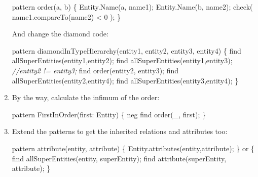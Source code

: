 \documentclass[]{report}
\newenvironment{Shaded}{}{}
\newcommand{\DecValTok}[1]{\textcolor[rgb]{0.25,0.63,0.44}{{#1}}}
\newcommand{\CommentTok}[1]{\textcolor[rgb]{0.38,0.63,0.69}{\textit{{#1}}}}
\newcommand{\FunctionTok}[1]{\textcolor[rgb]{0.02,0.16,0.49}{{#1}}}
\newcommand{\NormalTok}[1]{{#1}}
\begin{document}
\begin{enumerate}
\begin{Shaded}
\begin{Highlighting}[]
\NormalTok{pattern }\FunctionTok{order}\NormalTok{(a, b) \{}
    \NormalTok{Entity.}\FunctionTok{Name}\NormalTok{(a, name1);}
    \NormalTok{Entity.}\FunctionTok{Name}\NormalTok{(b, name2);}
    \FunctionTok{check}\NormalTok{(}
        \NormalTok{name1.}\FunctionTok{compareTo}\NormalTok{(name2) < }\DecValTok{0}
    \NormalTok{);}
\NormalTok{\}}
\end{Highlighting}
\end{Shaded}

  And change the diamond code:

\begin{Shaded}
\begin{Highlighting}[]
\NormalTok{pattern }\FunctionTok{diamondInTypeHierarchy}\NormalTok{(entity1, entity2, entity3, entity4) \{}
    \NormalTok{find }\FunctionTok{allSuperEntities}\NormalTok{(entity1,entity2);}
    \NormalTok{find }\FunctionTok{allSuperEntities}\NormalTok{(entity1,entity3);}
    \CommentTok{//entity2 != entity3;}
    \NormalTok{find }\FunctionTok{order}\NormalTok{(entity2, entity3);}
    \NormalTok{find }\FunctionTok{allSuperEntities}\NormalTok{(entity2,entity4);}
    \NormalTok{find }\FunctionTok{allSuperEntities}\NormalTok{(entity3,entity4);}
\NormalTok{\}}
\end{Highlighting}
\end{Shaded}
\item
  By the way, calculate the infimum of the order:

\begin{Shaded}
\begin{Highlighting}[]
\NormalTok{pattern }\FunctionTok{FirstInOrder}\NormalTok{(first: Entity) \{}
    \NormalTok{neg find }\FunctionTok{order}\NormalTok{(_, first);}
\NormalTok{\}}
\end{Highlighting}
\end{Shaded}
\item
  Extend the patterns to get the inherited relations and attributes too:

\begin{Shaded}
\begin{Highlighting}[]
\NormalTok{pattern }\FunctionTok{attribute}\NormalTok{(entity, attribute) \{}
    \NormalTok{Entity.}\FunctionTok{attributes}\NormalTok{(entity,attribute);}
\NormalTok{\} or \{}
    \NormalTok{find }\FunctionTok{allSuperEntities}\NormalTok{(entity, superEntity);}
    \NormalTok{find }\FunctionTok{attribute}\NormalTok{(superEntity, attribute);}
\NormalTok{\}}
\end{Highlighting}
\end{Shaded}


\end{enumerate}
\end{document}
